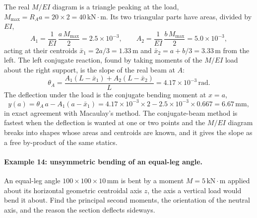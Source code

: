 The real $M/EI$ diagram is a triangle peaking at the load, $M_{\max} =
R_A a = 20 \times 2 = 40\,\text{kN}\cdot\text{m}$. Its two triangular
parts have areas, divided by $EI$,
\[
A_1 = \frac{1}{EI}\,\frac{a\,M_{\max}}{2} = 2.5 \times 10^{-3},
\qquad
A_2 = \frac{1}{EI}\,\frac{b\,M_{\max}}{2} = 5.0 \times 10^{-3},
\]
acting at their centroids $\bar{x}_1 = 2a/3 = 1.33\,\si{\meter}$ and
$\bar{x}_2 = a + b/3 = 3.33\,\si{\meter}$ from the left. The left
conjugate reaction, found by taking moments of the $M/EI$ load about the
right support, is the slope of the real beam at $A$:
\[
\theta_A = \frac{A_1(L - \bar{x}_1) + A_2(L - \bar{x}_2)}{L}
= 4.17 \times 10^{-3}\,\text{rad}.
\]
The deflection under the load is the conjugate bending moment at $x = a$,
\[
y(a) = \theta_A\,a - A_1(a - \bar{x}_1)
= 4.17\times 10^{-3} \times 2 - 2.5\times 10^{-3} \times 0.667
= 6.67\,\si{\milli\meter},
\]
in exact agreement with Macaulay's method. The conjugate-beam method is
fastest when the deflection is wanted at one or two points and the $M/EI$
diagram breaks into shapes whose areas and centroids are known, and it
gives the slope as a free by-product of the same statics.

\paragraph{Example 14: unsymmetric bending of an equal-leg angle.} An
equal-leg angle $100 \times 100 \times 10\,\si{\milli\meter}$ is bent by
a moment $M = 5\,\text{kN}\cdot\text{m}$ applied about its horizontal
geometric centroidal axis $z$, the axis a vertical load would bend it
about. Find the principal second moments, the orientation of the neutral
axis, and the reason the section deflects sideways.

